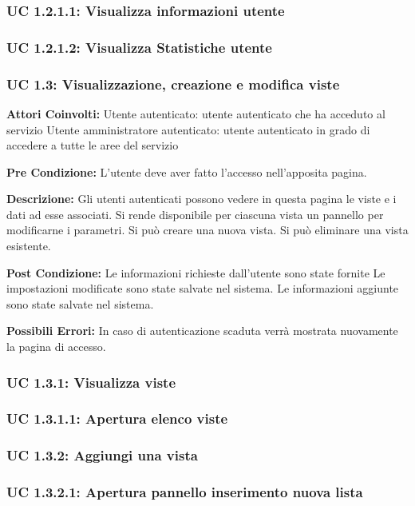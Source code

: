 \subsubsection{UC 1.2.1.1: Visualizza informazioni utente}

\subsubsection{UC 1.2.1.2: Visualizza Statistiche utente}

\subsubsection{UC 1.3: Visualizzazione, creazione e modifica viste}

\textbf{Attori Coinvolti:}
Utente autenticato: utente autenticato che ha acceduto al servizio
Utente amministratore autenticato: utente autenticato in grado di accedere a tutte le aree del servizio

\textbf{Pre Condizione:}
L’utente deve aver fatto l’accesso nell’apposita pagina.

\textbf{Descrizione:}
Gli utenti autenticati possono vedere in questa pagina le viste e i dati ad esse associati. 
Si rende disponibile per ciascuna vista un pannello per modificarne i parametri. 
Si può creare una nuova vista. 
Si può eliminare una vista esistente.

\textbf{Post Condizione:}
Le informazioni richieste dall’utente sono state fornite
Le impostazioni modificate sono state salvate nel sistema.
Le informazioni aggiunte sono state salvate nel sistema.

\textbf{Possibili Errori:}    
In caso di autenticazione scaduta verrà mostrata nuovamente la pagina di accesso.

\subsubsection{UC 1.3.1: Visualizza viste}

\subsubsection{UC 1.3.1.1: Apertura elenco viste}


\subsubsection{UC 1.3.2: Aggiungi una vista}

\subsubsection{UC 1.3.2.1: Apertura pannello inserimento nuova lista}

